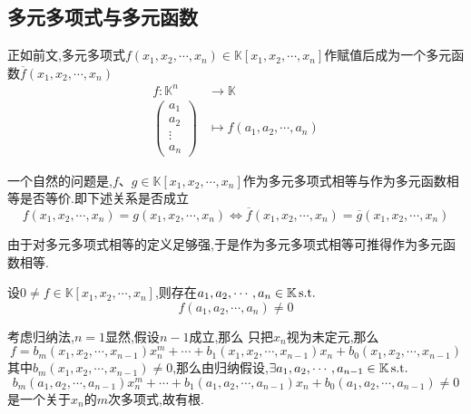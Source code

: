 \subsection{多元多项式与多元函数}
正如前文,多元多项式$f\left(
    x_1,x_2,\cdots,x_n
\right)\in
\mathbb{K}\left[
    x_1,x_2,\cdots,x_n\right]
$作赋值后成为一个多元函数$\overline{f}\left(
    x_1,x_2,\cdots,x_n
\right)$
\begin{align*}
    f:\mathbb{K}^n&\longrightarrow \mathbb{K}\\
    \begin{pmatrix}
        a_1\\
        a_2\\
        \vdots\\
        a_n
    \end{pmatrix}
       &\longmapsto f\left(
        a_1,a_2,\cdots,a_n
    \right)
\end{align*}
\begin{red}
    \begin{remark}
        一个自然的问题是,$f$、$g\in\mathbb{K}
        \left[
            x_1,x_2,\cdots,x_n
        \right]$作为多元多项式相等与作为多元函数相等是否等价.即下述关系是否成立
        \[
        f\left(
            x_1,x_2,\cdots,x_n
        \right)=g\left(
            x_1,x_2,\cdots,x_n
        \right)\Longleftrightarrow \overline{f}\left(
            x_1,x_2,\cdots,x_n
        \right)=\overline{g}\left(
            x_1,x_2,\cdots,x_n
        \right)
        \]  
    \end{remark}
\end{red}
\begin{red}
\begin{remark}
    由于对多元多项式相等的定义足够强,于是作为多元多项式相等可推得作为多元函数相等.
\end{remark}
\end{red}
\begin{green}
\begin{lemma}[非零多项式一定是非零函数]\label{lem:非零多项式一定是非零函数}
    设$0\neq f\in\mathbb{K}\left[
        x_1,x_2,\cdots,x_n
    \right]$,则存在$a_1,a_2,\cdots,a_n\in\mathbb{K}\,\textup{s.t.}$
    \[  f\left(
        a_1,a_2,\cdots,a_n
    \right)\neq 0 \]
\end{lemma}
\begin{Proof}
考虑归纳法,$n=1$显然,假设$n-1$成立,那么
只把$x_n$视为未定元,那么
\[
f=b_m\left(
    x_1,x_2,\cdots,x_{n-1}
\right)x_n^m+\cdots+b_1\left(
    x_1,x_2,\cdots,x_{n-1}
\right)x_n+b_0\left(
    x_1,x_2,\cdots,x_{n-1}
\right)
\]
其中$b_m\left(
    x_1,x_2,\cdots,x_{n-1}
\right)\neq 0$,那么由归纳假设,$\exists a_1,a_2,\cdots,a_{n-1}\in\mathbb{K}\,\textup{s.t.}$
\[
b_m\left(
    a_1,a_2,\cdots,a_{n-1}
\right)x_n^m+\cdots+b_1\left(
    a_1,a_2,\cdots,a_{n-1}
\right)x_n+b_0\left(
    a_1,a_2,\cdots,a_{n-1}
\right)\neq 0
\]
是一个关于$x_n$的$m$次多项式,故有根.
\end{Proof}
\end{green}
